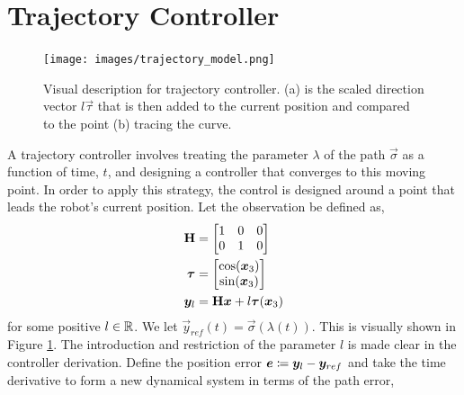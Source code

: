 \section{Trajectory Controller}\label{sec:trajectory}
\begin{figure}[!htbp]
    \centering
    \texttt{[image: images/trajectory\_model.png]}
    \caption{Visual description for trajectory controller. (a) is the scaled direction vector $l\vec{\tau}$ that is then added to the current position and compared to the point (b) tracing the curve.}
    \label{fig:basic_traj_vis}
\end{figure}
A trajectory controller involves treating the parameter $\lambda$ of the path $\vec{\sigma}$ as a function of time, $t$, and designing a controller that converges to this moving point. In order to apply this strategy, the control is designed around a point that leads the robot's current position. Let the observation be defined as,
\begin{align*}
    \mathbf{H} &= \begin{bmatrix} 1 & 0 & 0 \\ 0 & 1 & 0 \end{bmatrix}\\
    \bm{\tau} &= \begin{bmatrix} \cos(\bm{x}_3) \\ \sin(\bm{x}_3) \end{bmatrix} \\
    \bm{y}_l &= \mathbf{H}\bm{x} + l\bm{\tau}(\bm{x}_3)
\end{align*}
for some positive $l\in\mathbb{R}$. We let $\vec{y}_{ref}(t) = \vec{\sigma}\left(\lambda(t)\right)$. This is visually shown in Figure \ref{fig:basic_traj_vis}. The introduction and restriction of the parameter $l$ is made clear in the controller derivation. Define the position error $\bm{e} \coloneqq \bm{y}_l - \bm{y}_{ref}$ and take the time derivative to form a new dynamical system in terms of the path error,
